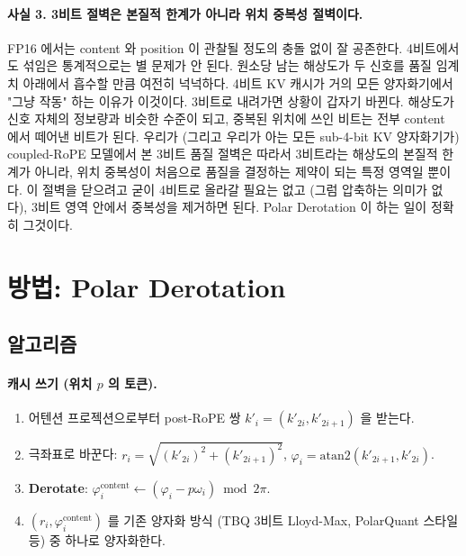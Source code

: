 \documentclass[10pt,twocolumn]{article}
\begin{document}
\paragraph{사실 3. 3비트 절벽은 본질적 한계가 아니라 위치 중복성 절벽이다.}
FP16 에서는 content 와 position 이 관찰될 정도의 충돌 없이 잘 공존한다. 4비트에서도 섞임은 통계적으로는 별 문제가 안 된다. 원소당 남는 해상도가 두 신호를 품질 임계치 아래에서 흡수할 만큼 여전히 넉넉하다. 4비트 KV 캐시가 거의 모든 양자화기에서 "그냥 작동" 하는 이유가 이것이다. 3비트로 내려가면 상황이 갑자기 바뀐다. 해상도가 신호 자체의 정보량과 비슷한 수준이 되고, 중복된 위치에 쓰인 비트는 전부 content 에서 떼어낸 비트가 된다. 우리가 (그리고 우리가 아는 모든 sub-4-bit KV 양자화기가) coupled-RoPE 모델에서 본 3비트 품질 절벽은 따라서 3비트라는 해상도의 본질적 한계가 아니라, 위치 중복성이 처음으로 품질을 결정하는 제약이 되는 특정 영역일 뿐이다. 이 절벽을 닫으려고 굳이 4비트로 올라갈 필요는 없고 (그럼 압축하는 의미가 없다), 3비트 영역 안에서 중복성을 제거하면 된다. Polar Derotation 이 하는 일이 정확히 그것이다.

\section{방법: Polar Derotation}
\label{sec:method}

\subsection{알고리즘}

\paragraph{캐시 쓰기 (위치 $p$ 의 토큰).}
\begin{enumerate}[leftmargin=*,topsep=2pt,itemsep=1pt]
\item 어텐션 프로젝션으로부터 post-RoPE 쌍 $k'_i=(k'_{2i},k'_{2i+1})$ 을 받는다.
\item 극좌표로 바꾼다: $r_i=\sqrt{(k'_{2i})^2+(k'_{2i+1})^2}$, $\varphi_i=\text{atan2}(k'_{2i+1},k'_{2i})$.
\item \textbf{Derotate}: $\varphi^{\text{content}}_i\leftarrow(\varphi_i-p\omega_i)\bmod 2\pi$.
\item $(r_i,\varphi^{\text{content}}_i)$ 를 기존 양자화 방식 (TBQ 3비트 Lloyd-Max, PolarQuant 스타일 등) 중 하나로 양자화한다.
\end{enumerate}
\end{document}
